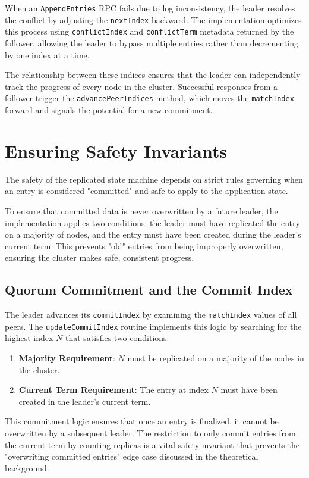 When an \texttt{AppendEntries} RPC fails due to log inconsistency, the leader resolves the conflict by adjusting the \texttt{nextIndex} backward.
The implementation optimizes this process using \texttt{conflictIndex} and \texttt{conflictTerm} metadata returned by the follower, allowing the leader to bypass multiple entries rather than decrementing by one index at a time.

The relationship between these indices ensures that the leader can independently track the progress of every node in the cluster. Successful responses from a follower trigger the \texttt{advancePeerIndices} method, which moves the \texttt{matchIndex} forward and signals the potential for a new commitment.

\section{Ensuring Safety Invariants}
The safety of the replicated state machine depends on strict rules governing when an entry is considered "committed" and safe to apply to the application state.

To ensure that committed data is never overwritten by a future leader, the implementation applies two conditions: the leader must have replicated the entry on a majority of nodes, and the entry must have been created during the leader's current term. This prevents "old" entries from being improperly overwritten, ensuring the cluster makes safe, consistent progress.

\subsection{Quorum Commitment and the Commit Index}
The leader advances its \texttt{commitIndex} by examining the \texttt{matchIndex} values of all peers.
The \texttt{updateCommitIndex} routine implements this logic by searching for the highest index $N$ that satisfies two conditions:
\begin{enumerate}
    \item \textbf{Majority Requirement}: $N$ must be replicated on a majority of the nodes in the cluster.
    \item \textbf{Current Term Requirement}: The entry at index $N$ must have been created in the leader's current term.
\end{enumerate}

This commitment logic ensures that once an entry is finalized, it cannot be overwritten by a subsequent leader. The restriction to only commit entries from the current term by counting replicas is a vital safety invariant that prevents the "overwriting committed entries" edge case discussed in the theoretical background.


